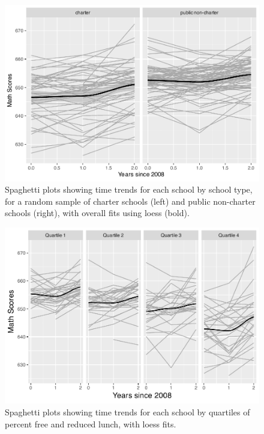 \documentclass[
]{krantz}
\begin{document}
\begin{figure}

{\centering \includegraphics[width=0.6\linewidth]{bookdown-BeyondMLR_files/figure-latex/lon-spag3-1} 

}

\caption{Spaghetti plots showing time trends for each school by school type, for a random sample of charter schools (left) and public non-charter schools (right), with overall fits using loess (bold).}\label{fig:lon-spag3}
\end{figure}

\begin{figure}

{\centering \includegraphics[width=0.6\linewidth]{bookdown-BeyondMLR_files/figure-latex/lon-spagmat1-1} 

}

\caption{Spaghetti plots showing time trends for each school by quartiles of percent free and reduced lunch, with loess fits.}\label{fig:lon-spagmat1}
\end{figure}
\end{document}
